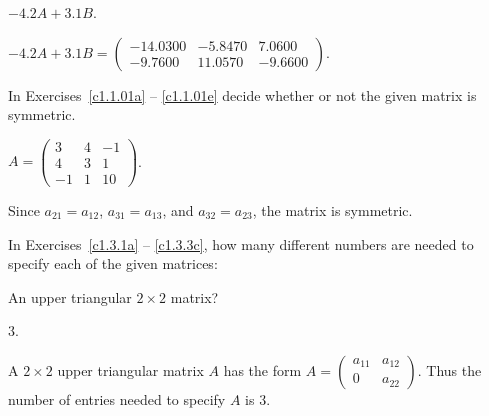 \documentclass{ximera}
\begin{document}
\begin{computerExercise}  \label{c1.2.4a}
$-4.2A+3.1B$.

\begin{solution}
\ans $-4.2A + 3.1B = \left(\begin{array}{rrr} 
-14.0300 & -5.8470 &    7.0600 \\
 -9.7600 & 11.0570 &   -9.6600\end{array}\right)$.

\end{solution}
\end{computerExercise}





\problemlabel

\noindent In Exercises~\ref{c1.1.01a} -- \ref{c1.1.01e} decide whether or
not the given matrix is symmetric.


\begin{exercise} \label{c1.1.01e}
 $A = \left( \begin{array}{rrr}
 3 & 4 & -1\\
 4 & 3 &  1\\
 -1 & 1 & 10\end{array} \right)$.
       

\begin{solution}
\ans Since $a_{21} = a_{12}$, $a_{31} = a_{13}$, and $a_{32} = a_{23}$, the matrix is symmetric.

\end{solution}
\end{exercise}





\problemlabel

In Exercises~\ref{c1.3.1a} -- \ref{c1.3.3c}, how many different numbers
are needed to specify each of the given matrices:


\begin{exercise}  \label{c1.3.1a}
An upper triangular $2\times 2$ matrix?

\begin{solution}
\ans $3$.

\soln A $2\times 2$ upper triangular matrix $A$ has the form $A = \left( \begin{array}{cc}
            a_{11} & a_{12} \\
            0 & a_{22} \end{array} \right)$.  Thus the number of entries needed to specify $A$ is $3$.  

\end{solution}
\end{exercise}
\end{document}
